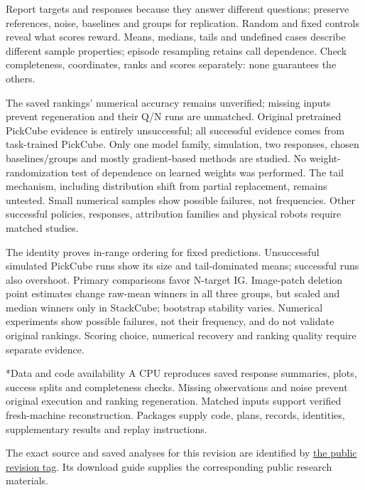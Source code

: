 \documentclass[12pt,letterpaper]{article}
\makeatletter
\newif\ifanonymous
\renewcommand\section{\@startsection{section}{1}{\z@}{10pt}{4pt}{\normalfont\normalsize\bfseries}}
\renewcommand\subsection{\@startsection{subsection}{2}{\z@}{6pt}{3pt}{\normalfont\normalsize\bfseries}}
\makeatother
\begin{document}
Report targets and responses because they answer different questions; preserve references, noise, baselines and groups for replication. Random and fixed controls reveal what scores reward. Means, medians, tails and undefined cases describe different sample properties; episode resampling retains call dependence. Check completeness, coordinates, ranks and scores separately: none guarantees the others.

\subsection{Limitations and conclusion}
The saved rankings' numerical accuracy remains unverified; missing inputs prevent regeneration and their Q/N runs are unmatched. Original pretrained PickCube evidence is entirely unsuccessful; all successful evidence comes from task-trained PickCube. Only one model family, simulation, two responses, chosen baselines/groups and mostly gradient-based methods are studied. No weight-randomization test of dependence on learned weights was performed\citep{adebayo2018sanity}. The tail mechanism, including distribution shift from partial replacement, remains untested. Small numerical samples show possible failures, not frequencies. Other successful policies, responses, attribution families and physical robots require matched studies.

The identity proves in-range ordering for fixed predictions. Unsuccessful simulated PickCube runs show its size and tail-dominated means; successful runs also overshoot. Primary comparisons favor N-target IG. Image-patch deletion point estimates change raw-mean winners in all three groups, but scaled and median winners only in StackCube; bootstrap stability varies. Numerical experiments show possible failures, not their frequency, and do not validate original rankings. Scoring choice, numerical recovery and ranking quality require separate evidence.

\section*{Data and code availability}
A CPU reproduces saved response summaries, plots, success splits and completeness checks. Missing observations and noise prevent original execution and ranking regeneration. Matched inputs support verified fresh-machine reconstruction. Packages supply code, plans, records, identities, supplementary results and replay instructions.
\ifanonymous
Anonymous materials are available through the \href{https://review.invalid/archive}{review archive}. This unlisted link requires no account; anyone holding it can download. The archive distinguishes current manuscript materials from scientific replay evidence.
\else
The exact source and saved analyses for this revision are identified by \href{https://github.com/itscool2b/ig-response-geometry/tree/nhsjs-revision-2026-11-02}{the public revision tag}. Its download guide supplies the corresponding public research materials.
\fi
\end{document}
